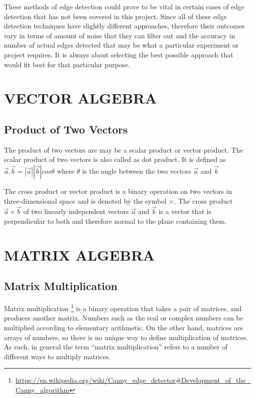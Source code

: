 \documentclass[BTech]{srmuthesis}
\begin{document}
These methods of edge detection could prove to be vital in certain cases of edge detection that has not been covered in this project. Since all of these edge detection techniques have slightly different approaches, therefore their outcomes vary in terms of amount of noise that they can filter out and the accuracy in number of actual edges detected that may be what a particular experiment or project requires. It is always about selecting the best possible approach that would fit best for that particular purpose.


\appendix
\chapter{VECTOR ALGEBRA}
\section{Product of Two Vectors}
\label{app:vp}
The product of two vectors are may be a scalar product or vector product. The scalar product of two vectors is also called as dot product. It is defined as $\vec{a} . \vec{b}=|\vec{a}||\vec{b}|cos\theta$ where $\theta$ is the angle between the two vectors $\vec{a}$ and $\vec{b}$

The cross product or vector product is a binary operation on two vectors in three-dimensional space and is denoted by the symbol $\times$. The cross product $\vec{a}\times\vec{b}$ of two linearly independent vectors $\vec{a}$ and $\vec{b}$ is a vector that is perpendicular to both and therefore normal to the plane containing them. 
\chapter{MATRIX ALGEBRA}
\section{Matrix Multiplication}
Matrix multiplication \footnote{\url{https://en.wikipedia.org/wiki/Canny_edge_detector#Development_of_the_Canny_algorithm}} is a binary operation that takes a pair of matrices, and produces another matrix. Numbers such as the real or complex numbers can be multiplied according to elementary arithmetic. On the other hand, matrices are arrays of numbers, so there is no unique way to define multiplication of matrices. As such, in general the term ``matrix multiplication'' refers to a number of different ways to multiply matrices. 
\end{document}

